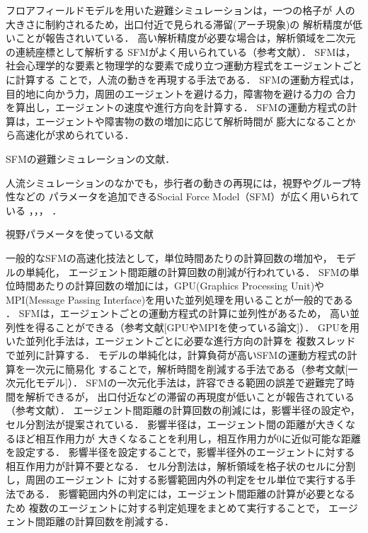 フロアフィールドモデルを用いた避難シミュレーションは，一つの格子が
人の大きさに制約されるため，出口付近で見られる滞留(アーチ現象)の
解析精度が低いことが報告されいている．
高い解析精度が必要な場合は，解析領域を二次元の連続座標として解析する
SFMがよく用いられている（参考文献）．
SFMは，社会心理学的な要素と物理学的な要素で成り立つ運動方程式をエージェントごとに計算する
ことで，人流の動きを再現する手法である\cite{helbing_sfm}．
SFMの運動方程式は，目的地に向かう力，周囲のエージェントを避ける力，障害物を避ける力の
合力を算出し，エージェントの速度や進行方向を計算する．
SFMの運動方程式の計算は，エージェントや障害物の数の増加に応じて解析時間が
膨大になることから高速化が求められている．


SFMの避難シミュレーションの文献\cite{sfm_hinan1}\cite{sfm_hinan2}\cite{sfm_hinan3}．

人流シミュレーションのなかでも，歩行者の動きの再現には，視野やグループ特性などの
パラメータを追加できるSocial Force Model（SFM）が広く用いられている
\cite{helbing_sfm}，\cite{sfm_ntt}，\cite{sfm_para1}，\cite{intro_gunshu}
．

視野パラメータを使っている文献\cite{siya_ex2}\cite{siya_ex3}\cite{siya_ex4}\cite{siya_ex5}\cite{siya_ex6}\cite{siya_ex7}




一般的なSFMの高速化技法として，単位時間あたりの計算回数の増加や，
モデルの単純化，
エージェント間距離の計算回数の削減が行われている．
SFMの単位時間あたりの計算回数の増加には，GPU(Graphics Processing Unit)や
MPI(Message Passing Interface)を用いた並列処理を用いることが一般的である
\cite{seru_sfm1}\cite{seru_sfm2}
\cite{sfm_gpu1}\cite{sfm_gpu2}\cite{sfm_gpu3}\cite{sfm_gpu4}．
\cite{mpi1}\cite{mpi2}
SFMは，エージェントごとの運動方程式の計算に並列性があるため，
高い並列性を得ることができる（参考文献[GPUやMPIを使っている論文]）．
GPUを用いた並列化手法は，エージェントごとに必要な進行方向の計算を
複数スレッドで並列に計算する．
モデルの単純化は，計算負荷が高いSFMの運動方程式の計算を一次元に簡易化
することで，解析時間を削減する手法である（参考文献[一次元化モデル]）．
SFMの一次元化手法は，許容できる範囲の誤差で避難完了時間を解析できるが，
出口付近などの滞留の再現度が低いことが報告されている
（参考文献）．
エージェント間距離の計算回数の削減には，影響半径の設定や，
セル分割法が提案されている\cite{cell1}\cite{cell2}．
影響半径は，エージェント間の距離が大きくなるほど相互作用力が
大きくなることを利用し，相互作用力が0に近似可能な距離を設定する．
影響半径を設定することで，影響半径外のエージェントに対する
相互作用力が計算不要となる\cite{eikyo_space}．
セル分割法は，解析領域を格子状のセルに分割し，周囲のエージェント
に対する影響範囲内外の判定をセル単位で実行する手法である．
影響範囲内外の判定には，エージェント間距離の計算が必要となるため
複数のエージェントに対する判定処理をまとめて実行することで，
エージェント間距離の計算回数を削減する．

